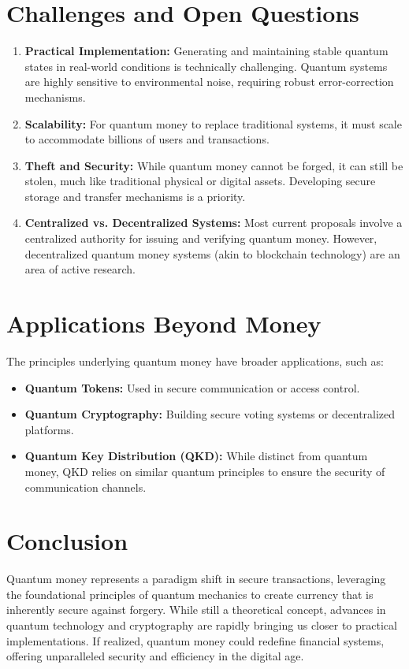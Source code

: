 \documentclass[11pt]{article}
\theoremstyle{definition}
\begin{document}
\section*{Challenges and Open Questions}
\begin{enumerate}
    \item \textbf{Practical Implementation:} Generating and maintaining stable quantum states in real-world conditions is technically challenging. Quantum systems are highly sensitive to environmental noise, requiring robust error-correction mechanisms.
    \item \textbf{Scalability:} For quantum money to replace traditional systems, it must scale to accommodate billions of users and transactions.
    \item \textbf{Theft and Security:} While quantum money cannot be forged, it can still be stolen, much like traditional physical or digital assets. Developing secure storage and transfer mechanisms is a priority.
    \item \textbf{Centralized vs. Decentralized Systems:} Most current proposals involve a centralized authority for issuing and verifying quantum money. However, decentralized quantum money systems (akin to blockchain technology) are an area of active research.
\end{enumerate}

\section*{Applications Beyond Money}
The principles underlying quantum money have broader applications, such as:
\begin{itemize}
    \item \textbf{Quantum Tokens:} Used in secure communication or access control.
    \item \textbf{Quantum Cryptography:} Building secure voting systems or decentralized platforms.
    \item \textbf{Quantum Key Distribution (QKD):} While distinct from quantum money, QKD relies on similar quantum principles to ensure the security of communication channels.
\end{itemize}

\section*{Conclusion}
Quantum money represents a paradigm shift in secure transactions, leveraging the foundational principles of quantum mechanics to create currency that is inherently secure against forgery. While still a theoretical concept, advances in quantum technology and cryptography are rapidly bringing us closer to practical implementations. If realized, quantum money could redefine financial systems, offering unparalleled security and efficiency in the digital age.
\end{document}
